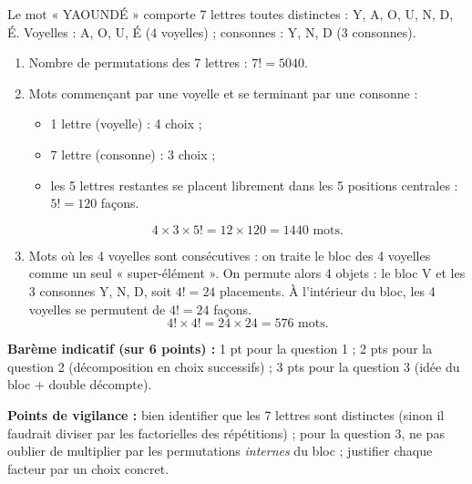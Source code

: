 \documentclass[11pt]{article}
\begin{document}
\begin{corrige}
Le mot « YAOUNDÉ » comporte 7 lettres toutes distinctes : Y, A, O, U, N, D, É. Voyelles : A, O, U, É (4 voyelles) ; consonnes : Y, N, D (3 consonnes).

\begin{enumerate}
    \item Nombre de permutations des 7 lettres : $7! = 5040$.
    \item Mots commençant par une voyelle et se terminant par une consonne :
    \begin{itemize}
        \item 1\iere{} lettre (voyelle) : 4 choix ;
        \item 7\ieme{} lettre (consonne) : 3 choix ;
        \item les 5 lettres restantes se placent librement dans les 5 positions centrales : $5! = 120$ façons.
    \end{itemize}
    \[ 4 \times 3 \times 5! = 12 \times 120 = 1440 \text{ mots.} \]
    \item Mots où les 4 voyelles sont consécutives : on traite le bloc des 4 voyelles comme un seul « super-élément ». On permute alors 4 objets : le bloc V et les 3 consonnes Y, N, D, soit $4! = 24$ placements. À l'intérieur du bloc, les 4 voyelles se permutent de $4! = 24$ façons.
    \[ 4! \times 4! = 24 \times 24 = 576 \text{ mots.} \]
\end{enumerate}

\textbf{Barème indicatif (sur 6 points) :} 1 pt pour la question 1 ; 2 pts pour la question 2 (décomposition en choix successifs) ; 3 pts pour la question 3 (idée du bloc + double décompte).

\textbf{Points de vigilance :} bien identifier que les 7 lettres sont distinctes (sinon il faudrait diviser par les factorielles des répétitions) ; pour la question 3, ne pas oublier de multiplier par les permutations \emph{internes} du bloc ; justifier chaque facteur par un choix concret.
\end{corrige}
\end{document}
